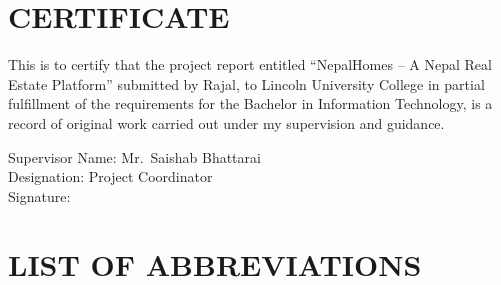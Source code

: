 \documentclass[12pt,a4paper]{report}
\begin{document}
\chapter*{CERTIFICATE}
\thispagestyle{plain}

This is to certify that the project report entitled
``NepalHomes -- A Nepal Real Estate Platform''
submitted by Rajal, to Lincoln University College in partial fulfillment of the
requirements for the Bachelor in Information Technology, is a record of original
work carried out under my supervision and guidance.

\vspace{2.5cm}
\noindent Supervisor Name: Mr.\ Saishab Bhattarai\\
Designation: Project Coordinator\\[2cm]
\noindent Signature:

\clearpage

\tableofcontents
\clearpage
\listoffigures
\clearpage
\listoftables
\clearpage

\chapter*{LIST OF ABBREVIATIONS}
\thispagestyle{plain}
\end{document}
